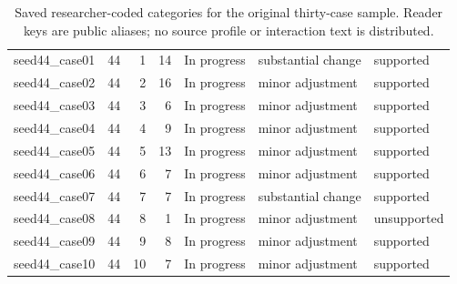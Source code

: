 \begin{table}[htbp!]
\begin{tabular}{lrrrlll}
seed44\_case01 & 44 & 1 & 14 & In progress & substantial change & supported \\
seed44\_case02 & 44 & 2 & 16 & In progress & minor adjustment & supported \\
seed44\_case03 & 44 & 3 & 6 & In progress & minor adjustment & supported \\
seed44\_case04 & 44 & 4 & 9 & In progress & minor adjustment & supported \\
seed44\_case05 & 44 & 5 & 13 & In progress & minor adjustment & supported \\
seed44\_case06 & 44 & 6 & 7 & In progress & minor adjustment & supported \\
seed44\_case07 & 44 & 7 & 7 & In progress & substantial change & supported \\
seed44\_case08 & 44 & 8 & 1 & In progress & minor adjustment & unsupported \\
seed44\_case09 & 44 & 9 & 8 & In progress & minor adjustment & supported \\
seed44\_case10 & 44 & 10 & 7 & In progress & minor adjustment & supported \\
\hline
\end{tabular}
\caption{Saved researcher-coded categories for the original thirty-case sample. Reader keys are public aliases; no source profile or interaction text is distributed.}
\label{chap:results:tab:rq3_profile_review_saved_categories}
\end{table}
